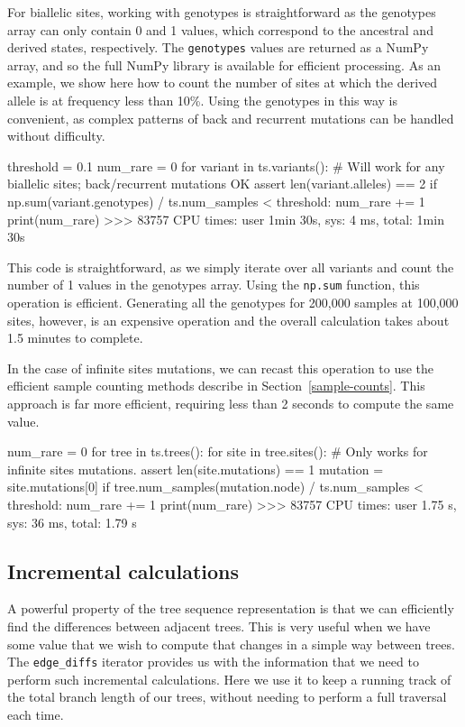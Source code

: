 \documentclass[graybox]{svmult}
\begin{document}
For biallelic sites, working with genotypes is straightforward as the
genotypes array can only contain 0 and 1 values, which correspond to
the ancestral and derived states, respectively. The \texttt{genotypes}
values are returned as a NumPy array, and so the full NumPy library is
available for efficient processing. As an example, we show here how to
count the number of sites at which the derived allele is at frequency
less than 10\%. Using the genotypes in this way is convenient, as
complex patterns of back and recurrent mutations can be handled without
difficulty.

\begin{pythoncode}
threshold = 0.1
num_rare = 0
for variant in ts.variants():
    # Will work for any biallelic sites; back/recurrent mutations OK
    assert len(variant.alleles) == 2
    if np.sum(variant.genotypes) / ts.num_samples < threshold:
        num_rare += 1
print(num_rare)
>>> 83757
CPU times: user 1min 30s, sys: 4 ms, total: 1min 30s
\end{pythoncode}

This code is straightforward, as we simply iterate over all variants and
count the number of 1 values in the genotypes array. Using the \texttt{np.sum}
function, this operation is efficient. Generating all the genotypes for
200,000 samples at 100,000 sites, however,
is an expensive operation and the overall calculation takes about 1.5 minutes
to complete.

In the case of infinite sites mutations, we can recast this operation
to use the efficient sample counting methods describe in
Section~\ref{sample-counts}. This approach is far more
efficient, requiring less than 2 seconds to compute the same value.
\begin{pythoncode}
num_rare = 0
for tree in ts.trees():
    for site in tree.sites():
        # Only works for infinite sites mutations.
        assert len(site.mutations) == 1
        mutation = site.mutations[0]
        if tree.num_samples(mutation.node) / ts.num_samples < threshold:
            num_rare += 1
print(num_rare)
>>> 83757
CPU times: user 1.75 s, sys: 36 ms, total: 1.79 s
\end{pythoncode}

\subsection{Incremental calculations}\label{incremental-calculations}

A powerful property of the tree sequence representation is that we can
efficiently find the differences between adjacent trees. This is very
useful when we have some value that we wish to compute that changes in a
simple way between trees. The \texttt{edge\_diffs} iterator provides us
with the information that we need to perform such incremental
calculations. Here we use it to keep a running track of the total branch
length of our trees, without needing to perform a full traversal each
time.
\end{document}
